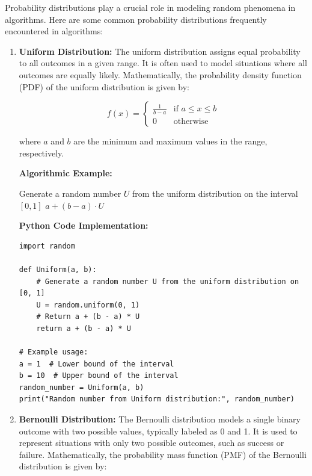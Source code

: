 \documentclass[12pt]{book} %
\begin{document}
Probability distributions play a crucial role in modeling random phenomena in algorithms. Here are some common probability distributions frequently encountered in algorithms:

\begin{enumerate}
    \item \textbf{Uniform Distribution:} The uniform distribution assigns equal probability to all outcomes in a given range. It is often used to model situations where all outcomes are equally likely. Mathematically, the probability density function (PDF) of the uniform distribution is given by:
    
    \[
    f(x) = \begin{cases} 
      \frac{1}{b-a} & \text{if } a \leq x \leq b \\
      0 & \text{otherwise}
   \end{cases}
    \]
    
    where \(a\) and \(b\) are the minimum and maximum values in the range, respectively.

\textbf{Algorithmic Example:}
    \FloatBarrier
\begin{algorithm}
\caption{Generating Random Numbers from a Uniform Distribution}
\begin{algorithmic}[1]
    \State Generate a random number \(U\) from the uniform distribution on the interval \([0, 1]\)
    \State \Return \(a + (b - a) \cdot U\)
\EndProcedure
\end{algorithmic}
\end{algorithm}
\FloatBarrier
  \textbf{Python Code Implementation:}
  \FloatBarrier
  \begin{lstlisting}
import random

def Uniform(a, b):
    # Generate a random number U from the uniform distribution on [0, 1]
    U = random.uniform(0, 1)
    # Return a + (b - a) * U
    return a + (b - a) * U

# Example usage:
a = 1  # Lower bound of the interval
b = 10  # Upper bound of the interval
random_number = Uniform(a, b)
print("Random number from Uniform distribution:", random_number)
  \end{lstlisting}
  
    \item \textbf{Bernoulli Distribution:} The Bernoulli distribution models a single binary outcome with two possible values, typically labeled as 0 and 1. It is used to represent situations with only two possible outcomes, such as success or failure. Mathematically, the probability mass function (PMF) of the Bernoulli distribution is given by:
    

\end{enumerate}
\end{document}
